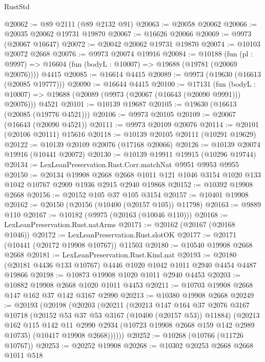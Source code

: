 \begin{lexlean}{RustStd}
\begin{coremodule}
@20062 := @89 @2111 (@89 @2132 @91)
@20063 := @20058 @20062
@20066 := @20035 @20062 @19731 @19870
@20067 := @16626 @20066
@20069 := @9973 (@20067 @16647)
@20072 := @20042 @20062 @19731 @19870
@20074 := @10103 @20072 @2668
@20076 := @9973 @20074 @19916
@20084 := @10188
    (fun (pl : @9997) => @16604 (fun (bodyL : @10007) => @19688 (@19781 (@20069 @20076))))
    @4415
@20085 := @16614 @4415
@20089 := @9973 (@19630 (@16613 (@20085 @19777)))
@20090 := @16644 @4415
@20100 := @17131
    (fun (bodyL : @10007) => @19688 (@20089 (@9973 (@20067 (@16643 (@20090 @9991))) @20076)))
    @4521
@20101 := @10139 @19687
@20105 := @19630 (@16613 (@20085 (@19776 @4521)))
@20106 := @9973 @20105
@20109 := @20067 (@16643 (@20090 @4521))
@20111 := @9973 @20109 @20076
@20114 := @20101 (@20106 @20111) @15616
@20118 := @10139 @20105 @20111 (@10291 @19629)
@20122 := @10139 @20109 @20076 (@17168 @20066)
@20126 := @10139 @20074 @19916 (@10441 @20072)
@20130 := @10139 @19911 @19915 (@10296 @19744)
@20134 := LexLeanPreservation.Rust.Corr.matchNat @9951 @9953 @9955
@20150 := @20134
    @19908
    @2668
    @2668
    @1011
    @121
    @1046
    @3154
    @1020
    @133
    @1042
    @10767
    @2909
    @1936
    @2915
    @2940
    @19868
@20152 := @10392 @19908 @2668
@20156 := @20152 @105 @37 @105 @3154
@20157 := @10401 @19908
@20162 := @20150 (@20156 (@10400 (@20157 @105)) @11798)
@20163 := @9889 @110
@20167 := @10182 (@9975 (@20163 (@10046 @110)))
@20168 := LexLeanPreservation.Rust.natArms
@20171 := @20162 (@20167 (@20168 @1046))
@20172 := LexLeanPreservation.Rust.slotOK
@20177 := @20171 (@10441 (@20172 @19908 @10767)) @11503
@20180 := @10540 @19908 @2668 @2668
@20181 := LexLeanPreservation.Rust.Kind.nat
@20193 := @20180 (@20181 @4436 @133 @10767) @4446 @1020 @1042 @1011 @2940 @4454 @4487 @19866
@20198 := @10873 @19908 @1020 @1011 @2940 @4453
@20203 := @10882 @19908 @2668 @1020 @1011 @4453
@20211 := @10703 @19908 @2668 @147 @162 @37 @142 @3167 @2990
@20213 := @10380 @19908 @2668
@20249 := @20193
    (@20198
      (@20203
        (@20211
          (@20213
            @147
            @164
            @37
            @2076
            @3167
            @10718
            (@20152 @53 @37 @53 @3167 (@10400 (@20157 @53)) @11884)
            (@20213
              @162
              @115
              @142
              @11
              @2990
              @2934
              (@10723 @19908 @2668 @159 @142 @2989 @10735)
              (@10417 @19908 @2668))))))
@20252 := @10268 (@10766 (@11726 @10767))
@20253 := @20252 @19908
@20268 := @10302
    @20253
    @2668
    @2668
    @1011
    @518

\end{coremodule}
\end{lexlean}
